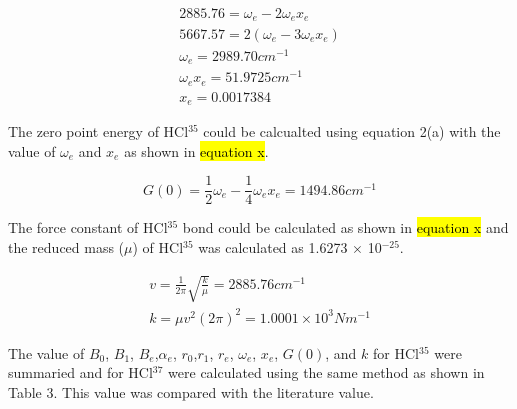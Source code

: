 \documentclass[twocolumn]{article} %
\begin{document}
\begin{subequations}
    \begin{gather}
        2885.76 = \omega_e - 2\omega_ex_e \\
        5667.57 = 2(\omega_e - 3\omega_ex_e)\\
        \omega_e = 2989.70 cm^{-1}\\
        \omega_e x_e = 51.9725 cm^{-1}\\
        x_e = 0.0017384
    \end{gather}
\end{subequations}

The zero point energy of HCl$^{35}$ could be calcualted using equation 2(a) with the value of $\omega_e$ and $x_e$ as shown in \hl{equation x}. 

\begin{equation}
    G(0) = \frac{1}{2}\omega_e - \frac{1}{4}\omega_ex_e = 1494.86 cm^{-1}
\end{equation}

The force constant of HCl$^{35}$ bond could be calculated as shown in \hl{equation x} and the reduced mass ($\mu$) of HCl$^{35}$ was calculated as 1.6273 $\times$ 10$^{-25}$. 

\begin{subequations}
    \begin{gather}
        v = \frac{1}{2\pi}\sqrt{\frac{k}{\mu}} = 2885.76 cm^{-1}\\
        k = \mu v^2 (2\pi)^2 = 1.0001 \times 10^{3} Nm^{-1}
    \end{gather}
\end{subequations}

The value of $B_0$, $B_1$, $B_e$,$\alpha_e$, $r_0$,$r_1$, $r_e$, $\omega_e$, $x_e$, $G(0)$, and $k$ for HCl$^{35}$ were summaried and for HCl$^{37}$ were calculated using the same method as shown in Table 3. This value was compared with the literature value.
\end{document}
